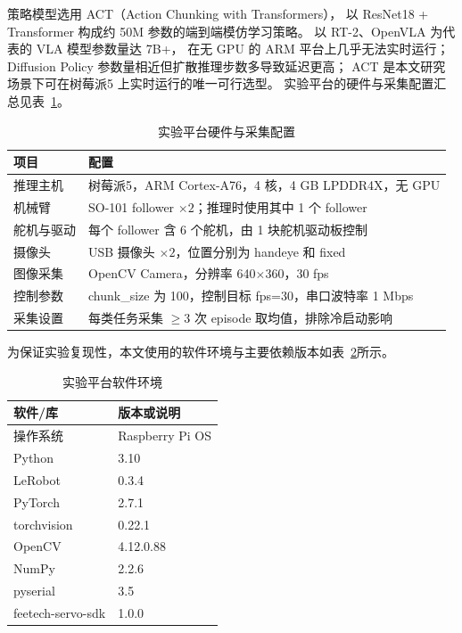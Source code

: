 策略模型选用 ACT（Action Chunking with Transformers），
以 ResNet18 + Transformer 构成约 50M 参数的端到端模仿学习策略。
以 RT-2\cite{rt2}、OpenVLA\cite{openvla} 为代表的 VLA 模型参数量达 7B+，
在无 GPU 的 ARM 平台上几乎无法实时运行；
Diffusion Policy 参数量相近但扩散推理步数多导致延迟更高；
ACT 是本文研究场景下可在树莓派5 上实时运行的唯一可行选型。
实验平台的硬件与采集配置汇总见表~\ref{tab:experiment-hardware-config}。

\begin{table}[htbp]
  \centering
  \caption{实验平台硬件与采集配置}
  \label{tab:experiment-hardware-config}
  \begin{tabularx}{\textwidth}{@{}p{}X@{}}
  \toprule
  项目 & 配置 \\
  \midrule
  推理主机 & 树莓派5，ARM Cortex-A76，4 核，4 GB LPDDR4X，无 GPU \\
  机械臂 & SO-101 follower $\times 2$；推理时使用其中 1 个 follower \\
  舵机与驱动 & 每个 follower 含 6 个舵机，由 1 块舵机驱动板控制 \\
  摄像头 & USB 摄像头 $\times 2$，位置分别为 handeye 和 fixed \\
  图像采集 & OpenCV Camera，分辨率 640$\times$360，30 fps \\
  控制参数 & chunk\_size 为 100，控制目标 fps=30，串口波特率 1 Mbps \\
  采集设置 & 每类任务采集 $\geq 3$ 次 episode 取均值，排除冷启动影响 \\
  \bottomrule
  \end{tabularx}
\end{table}

为保证实验复现性，本文使用的软件环境与主要依赖版本如表~\ref{tab:experiment-software-config}所示。

\begin{table}[htbp]
  \centering
  \caption{实验平台软件环境}
  \label{tab:experiment-software-config}
  \begin{tabularx}{\textwidth}{@{}p{}X@{}}
  \toprule
  软件/库 & 版本或说明 \\
  \midrule
  操作系统 & Raspberry Pi OS \\
  Python & 3.10 \\
  LeRobot & 0.3.4 \\
  PyTorch & 2.7.1 \\
  torchvision & 0.22.1 \\
  OpenCV & 4.12.0.88 \\
  NumPy & 2.2.6 \\
  pyserial & 3.5 \\
  feetech-servo-sdk & 1.0.0 \\
  \bottomrule
  \end{tabularx}
\end{table}
